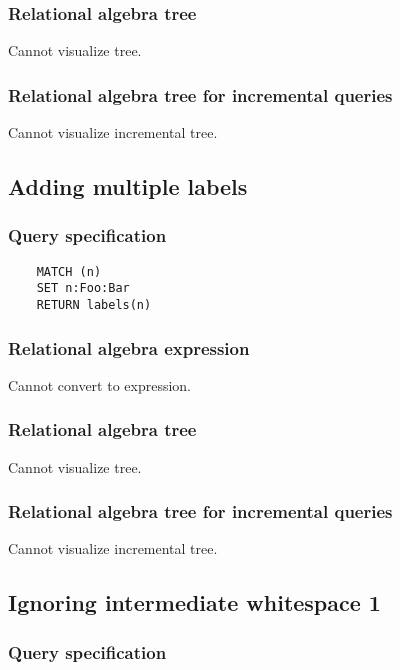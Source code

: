 	\subsubsection*{Relational algebra tree}

	Cannot visualize tree.

	\subsubsection*{Relational algebra tree for incremental queries}

	Cannot visualize incremental tree.
	\subsection{Adding multiple labels}

	\subsubsection*{Query specification}

	\begin{lstlisting}
	MATCH (n)
	SET n:Foo:Bar
	RETURN labels(n)
	\end{lstlisting}


	\subsubsection*{Relational algebra expression}

	Cannot convert to expression.

	\subsubsection*{Relational algebra tree}

	Cannot visualize tree.

	\subsubsection*{Relational algebra tree for incremental queries}

	Cannot visualize incremental tree.
	\subsection{Ignoring intermediate whitespace 1}

	\subsubsection*{Query specification}

